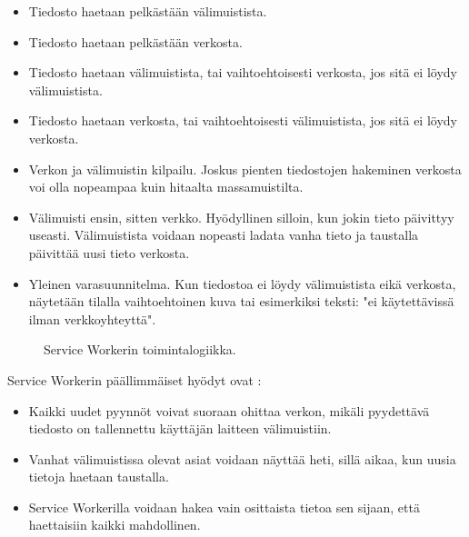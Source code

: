 \documentclass{tktltiki}
\begin{document}
\begin{itemize}
  \item Tiedosto haetaan pelkästään välimuistista.
  \item Tiedosto haetaan pelkästään verkosta.
  \item Tiedosto haetaan välimuistista, tai vaihtoehtoisesti verkosta, jos sitä ei löydy välimuistista.
  \item Tiedosto haetaan verkosta, tai vaihtoehtoisesti välimuistista, jos sitä ei löydy verkosta.
  \item Verkon ja välimuistin kilpailu. Joskus pienten tiedostojen hakeminen verkosta voi olla nopeampaa kuin hitaalta massamuistilta.
  \item Välimuisti ensin, sitten verkko. Hyödyllinen silloin, kun jokin tieto päivittyy useasti. Välimuistista voidaan nopeasti ladata vanha tieto ja taustalla päivittää uusi tieto verkosta.
  \item Yleinen varasuunnitelma. Kun tiedostoa ei löydy välimuistista eikä verkosta, näytetään tilalla vaihtoehtoinen kuva tai esimerkiksi teksti: "ei käytettävissä ilman verkkoyhteyttä".
\end{itemize}

\begin{figure}[hbt!]
\begin{center}
\caption{Service Workerin toimintalogiikka. }
\label{Service workerin toiminta}
\end{center}
\end{figure}


Service Workerin päällimmäiset hyödyt ovat \cite{GoogleDevSummit}:

\begin{itemize}
  \item Kaikki uudet pyynnöt voivat suoraan ohittaa verkon, mikäli pyydettävä tiedosto on tallennettu käyttäjän laitteen välimuistiin.
  \item Vanhat välimuistissa olevat asiat voidaan näyttää heti, sillä aikaa, kun uusia tietoja haetaan taustalla.
  \item Service Workerilla voidaan hakea vain osittaista tietoa sen sijaan, että haettaisiin kaikki mahdollinen.
\end{itemize}
\end{document}
